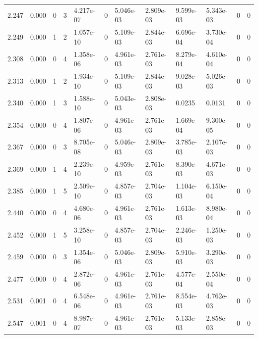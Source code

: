 \documentclass[preview]{standalone}
\begin{document}
{{{\begin{tabular}{L{1.2cm}C{1.2cm} C{0.3cm}C{0.5cm} C{1.4cm}C{1.4cm} C{1.4cm}C{1.4cm} C{1.6cm}C{1.6cm} C{1.6cm}C{1.6cm}}
  2.247  &  0.000  & 0     &  3 &  4.217e-07  & 0  &  5.046e-03&   2.809e-03& 9.599e-03 & 5.343e-03   &  0 & 0  \\ 
  2.249  &  0.000  & 1     &  2 &  1.057e-10  & 0  &  5.109e-03&   2.844e-03& 6.696e-04 & 3.730e-04   &  0 & 0  \\ 
  2.308  &  0.000  & 0     &  4 &  1.358e-06  & 0  &  4.961e-03&   2.761e-03& 8.279e-04 & 4.610e-04   &  0 & 0  \\ 
  2.313  &  0.000  & 1     &  2 &  1.934e-10  & 0  &  5.109e-03&   2.844e-03& 9.028e-03 & 5.026e-03   &  0 & 0  \\ 
  2.340  &  0.000  & 1     &  3 &  1.588e-10  & 0  &  5.043e-03&   2.808e-03& 0.0235 & 0.0131   &  0 & 0  \\ 
  2.354  &  0.000  & 0     &  4 &  1.807e-06  & 0  &  4.961e-03&   2.761e-03& 1.669e-04 & 9.300e-05   &  0 & 0  \\ 
  2.367  &  0.000  & 0     &  3 &  8.705e-08  & 0  &  5.046e-03&   2.809e-03& 3.785e-03 & 2.107e-03   &  0 & 0  \\ 
  2.369  &  0.000  & 1     &  4 &  2.239e-10  & 0  &  4.959e-03&   2.761e-03& 8.390e-03 & 4.671e-03   &  0 & 0  \\ 
  2.385  &  0.000  & 1     &  5 &  2.509e-10  & 0  &  4.857e-03&   2.704e-03& 1.104e-03 & 6.150e-04   &  0 & 0  \\ 
  2.440  &  0.000  & 0     &  4 &  4.680e-06  & 0  &  4.961e-03&   2.761e-03& 1.613e-03 & 8.980e-04   &  0 & 0  \\ 
  2.452  &  0.000  & 1     &  5 &  3.258e-10  & 0  &  4.857e-03&   2.704e-03& 2.246e-03 & 1.250e-03   &  0 & 0  \\ 
  2.459  &  0.000  & 0     &  3 &  1.354e-06  & 0  &  5.046e-03&   2.809e-03& 5.910e-03 & 3.290e-03   &  0 & 0  \\ 
  2.477  &  0.000  & 0     &  4 &  2.872e-06  & 0  &  4.961e-03&   2.761e-03& 4.577e-04 & 2.550e-04   &  0 & 0  \\ 
  2.531  &  0.001  & 0     &  4 &  6.548e-06  & 0  &  4.961e-03&   2.761e-03& 8.554e-03 & 4.762e-03   &  0 & 0  \\ 
  2.547  &  0.001  & 0     &  4 &  8.987e-07  & 0  &  4.961e-03&   2.761e-03& 5.133e-03 & 2.858e-03   &  0 & 0  \\ 
\hline 
\end{tabular} 

}}}
\end{document}
